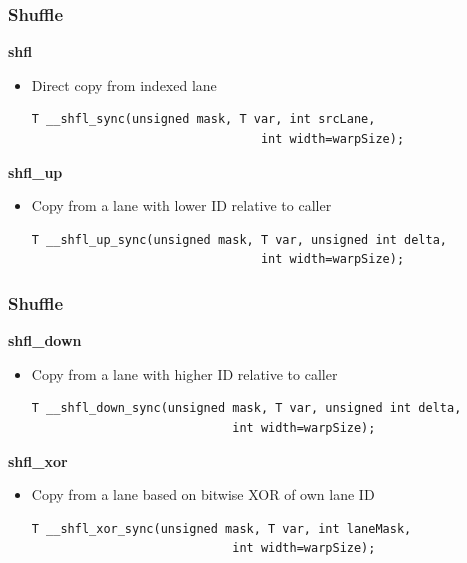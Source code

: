 \documentclass[aspectratio=169,handout]{beamer}
\begin{document}
\begin{frame}[fragile]
\frametitle{Shuffle}

\textbf{shfl}
\begin{itemize}
	\item[] Direct copy from indexed lane
\begin{lstlisting}
T __shfl_sync(unsigned mask, T var, int srcLane, 
								int width=warpSize);
\end{lstlisting}
\end{itemize}

\textbf{shfl\_up}
\begin{itemize}
	\item[] Copy from a lane with lower ID relative to caller
\begin{lstlisting}
T __shfl_up_sync(unsigned mask, T var, unsigned int delta, 
								int width=warpSize);
\end{lstlisting}
\end{itemize}

\end{frame}




\begin{frame}[fragile]
\frametitle{Shuffle}

\textbf{shfl\_down}
\begin{itemize}
	\item[] Copy from a lane with higher ID relative to caller
\begin{lstlisting}
T __shfl_down_sync(unsigned mask, T var, unsigned int delta, 
							int width=warpSize);
\end{lstlisting}
\end{itemize}

\textbf{shfl\_xor}
\begin{itemize}
	\item[] Copy from a lane based on bitwise XOR of own lane ID
\begin{lstlisting}
T __shfl_xor_sync(unsigned mask, T var, int laneMask, 
							int width=warpSize);
\end{lstlisting}
\end{itemize}

\end{frame}


\end{document}
